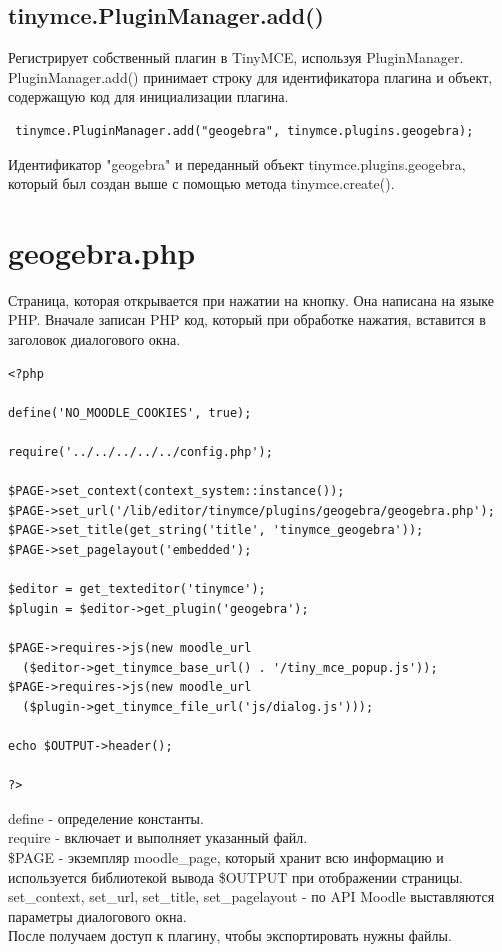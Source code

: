 \documentclass[14pt,Diplom]{diplomwork}
\begin{document}
\subsection{tinymce.PluginManager.add()}
 Регистрирует собственный плагин в TinyMCE, используя PluginManager. PluginManager.add() принимает строку для идентификатора плагина и объект, содержащую код для инициализации плагина.
 \begin{verbatim}
 tinymce.PluginManager.add("geogebra", tinymce.plugins.geogebra);
 \end{verbatim}
 Идентификатор "geogebra" и переданный объект tinymce.plugins.geogebra, который был создан выше с помощью метода tinymce.create().
 
\section{geogebra.php}
Страница, которая открывается при нажатии на кнопку. Она написана на языке PHP. Вначале записан PHP код, который при обработке нажатия, вставится в заголовок диалогового окна.

\begin{verbatim}
<?php

define('NO_MOODLE_COOKIES', true);

require('../../../../../config.php');

$PAGE->set_context(context_system::instance());
$PAGE->set_url('/lib/editor/tinymce/plugins/geogebra/geogebra.php');
$PAGE->set_title(get_string('title', 'tinymce_geogebra'));
$PAGE->set_pagelayout('embedded');

$editor = get_texteditor('tinymce');
$plugin = $editor->get_plugin('geogebra');

$PAGE->requires->js(new moodle_url
  ($editor->get_tinymce_base_url() . '/tiny_mce_popup.js'));
$PAGE->requires->js(new moodle_url
  ($plugin->get_tinymce_file_url('js/dialog.js')));

echo $OUTPUT->header();

?>
\end{verbatim}
define - определение константы.\\
require - включает и выполняет указанный файл.\\
\$PAGE - экземпляр moodle\_page, который хранит всю информацию и используется библиотекой вывода \$OUTPUT при отображении страницы.\\
set\_context, set\_url, set\_title, set\_pagelayout - по API Moodle выставляются параметры диалогового окна.\\
После получаем доступ к плагину, чтобы экспортировать нужны файлы.
\end{document}
